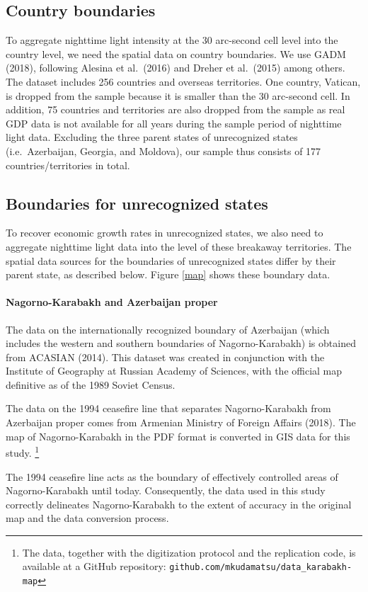 \documentclass[12pt,a4paper]{article}%
\begin{document}
\subsection{Country boundaries}
To aggregate nighttime light intensity at the 30 arc-second cell level into the country level, we need the spatial data on country boundaries. 
We use GADM (2018), following Alesina et al.\ (2016) and Dreher et al.\ (2015) among others. 
The dataset includes 256 countries and overseas territories. 
One country, Vatican, is dropped from the sample because it is smaller than the 30 arc-second cell. 
In addition, 75 countries and territories are also dropped from the sample as real GDP data is not available for all years during the sample period of nighttime light data.
Excluding the three parent states of unrecognized states (i.e.\ Azerbaijan, Georgia, and Moldova), our sample thus consists of 177 countries/territories in total.

\subsection{Boundaries for unrecognized states}\label{boundaries}
To recover economic growth rates in unrecognized states, we also need to aggregate nighttime light data into the level of these breakaway territories. 
The spatial data sources for the boundaries of unrecognized states differ by their parent state, as described below. 
Figure \ref{map} shows these boundary data.
\paragraph{Nagorno-Karabakh and Azerbaijan proper}
The data on the internationally recognized boundary of Azerbaijan (which includes the western and southern boundaries of Nagorno-Karabakh) is obtained from ACASIAN (2014). This dataset was created in conjunction with the Institute of Geography at Russian Academy of Sciences, with the official map definitive as of the 1989 Soviet Census. 

The data on the 1994 ceasefire line that separates Nagorno-Karabakh from Azerbaijan proper comes from Armenian Ministry of Foreign Affairs (2018). The map of Nagorno-Karabakh in the PDF format is converted in GIS data for this study.%
\footnote{
	The data, together with the digitization protocol and the replication code, is available at a GitHub repository: \verb!github.com/mkudamatsu/data_karabakh-map!
}

The 1994 ceasefire line acts as the boundary of effectively controlled areas of Nagorno-Karabakh until today. Consequently, the data used in this study correctly delineates Nagorno-Karabakh to the extent of accuracy in the original map and the data conversion process.
\end{document}
